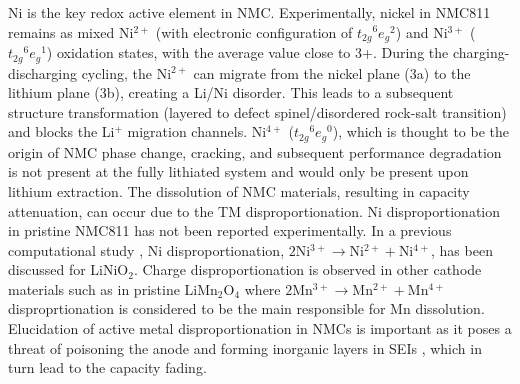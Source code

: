 \documentclass[journal=jacsat,manuscript=article]{achemso}
\begin{document}
Ni is the key redox active element in NMC. Experimentally, nickel in NMC811 remains as mixed Ni$^{2+}$ (with electronic configuration of ${t_{2g}}^{6}{e_{g}}^{2}$) and Ni$^{3+}$ (${t_{2g}}^{6}{e_{g}}^{1}$) oxidation states, with the average value close to 3+. \cite{Zhu_JMatChemA2019,Katharina-chemmater,Kondrakov_JPhysChemC2017} During the charging-discharging cycling, the Ni$^{2+}$  can migrate from the nickel plane (3a) to the lithium plane (3b), creating a Li/Ni disorder. \cite{Zhang-acs.chemmater-2019, Feng-2019, Xia2018} This leads to a subsequent structure transformation (layered to defect spinel/disordered rock-salt transition) and blocks the Li$^{+}$  migration channels. \cite{Xia2018} Ni$^{4+}$ (${t_{2g}}^{6}{e_{g}}^{0}$), which is thought to be the origin of NMC phase change, cracking, and subsequent performance degradation is not present at the fully lithiated system and would only be present upon lithium extraction. \cite{Katharina-chemmater,Li-aenm-2019,Li-EER-2020}   
The dissolution of NMC materials, resulting in capacity attenuation, can occur due to the TM disproportionation. \cite{buchberger2015} Ni disproportionation in pristine NMC811 has not been reported experimentally. In a previous computational study \cite{HChen_PhysRevB2011},  Ni disproportionation, $2$Ni$^{3+}\rightarrow$Ni$^{2+} + $Ni$^{4+}$, has been discussed for LiNiO$_2$. Charge disproportionation is observed in other cathode materials such as in pristine LiMn$_2$O$_4$ where  $2$Mn$^{3+}\rightarrow$Mn$^{2+} + $Mn$^{4+}$ disproprtionation is considered to be the main responsible for Mn dissolution. Elucidation of active metal disproportionation in NMCs is important as it poses a threat of poisoning the anode \cite{Parmar-LMO-2020,PASQUALINI2017} and forming inorganic layers in SEIs \cite{joshi2014}, which in turn lead to the capacity fading. 
\end{document}
